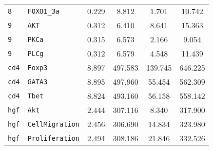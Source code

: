 \begin{longtable}{llcccc}
\texttt{8} & \texttt{FOXO1\_3a} & 0.229 & 8.812 & 1.701 & 10.742 \\
\texttt{9} & \texttt{AKT} & 0.312 & 6.410 & 8.641 & 15.363 \\
\texttt{9} & \texttt{PKCa} & 0.315 & 6.573 & 2.166 & 9.054 \\
\texttt{9} & \texttt{PLCg} & 0.312 & 6.579 & 4.548 & 11.439 \\
\texttt{cd4} & \texttt{Foxp3} & 8.897 & 497.583 & 139.745 & 646.225 \\
\texttt{cd4} & \texttt{GATA3} & 8.895 & 497.960 & 55.454 & 562.309 \\
\texttt{cd4} & \texttt{Tbet} & 8.824 & 493.160 & 56.158 & 558.142 \\
\texttt{hgf} & \texttt{Akt} & 2.444 & 307.116 & 8.340 & 317.900 \\
\texttt{hgf} & \texttt{CellMigration} & 2.456 & 306.690 & 14.834 & 323.980 \\
\texttt{hgf} & \texttt{Proliferation} & 2.494 & 308.186 & 21.846 & 332.526 \\
\end{longtable}
\endgroup
\clearpage
